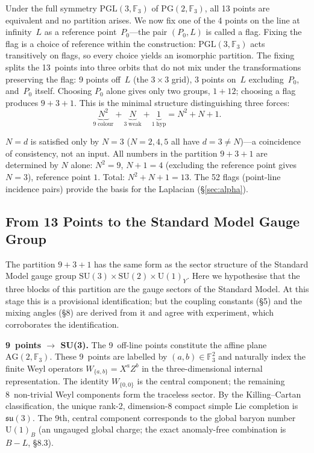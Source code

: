 \documentclass[12pt,a4paper]{article}
\begin{document}
Under the full symmetry $\mathrm{PGL}(3, \mathbb{F}_3)$ of $\mathrm{PG}(2, \mathbb{F}_3)$, all 13 points are equivalent and no partition arises. We now fix one of the 4 points on the line at infinity~$L$ as a reference point~$P_0$---the pair $(P_0, L)$ is called a flag. Fixing the flag is a choice of reference within the construction: $\mathrm{PGL}(3, \mathbb{F}_3)$ acts transitively on flags, so every choice yields an isomorphic partition. The fixing splits the 13~points into three orbits that do not mix under the transformations preserving the flag: 9 points off~$L$ (the $3\times 3$ grid),
3 points on~$L$ excluding~$P_0$, and~$P_0$ itself.
Choosing $P_0$ alone gives only two groups, $1{+}12$;
choosing a flag produces $9{+}3{+}1$.
This is the minimal structure distinguishing three forces:
\begin{equation}
  \underbrace{N^2}_{9\;\mathrm{colour}} +
  \underbrace{N}_{3\;\mathrm{weak}} +
  \underbrace{1}_{1\;\mathrm{hyp}} = N^2 + N + 1.
\end{equation}

$N = d$ is satisfied only by $N = 3$ ($N = 2, 4, 5$ all have $d = 3 \neq N$)---a coincidence of consistency, not an input.
All numbers in the partition $9{+}3{+}1$ are determined by $N$ alone:
$N^2 = 9$, $N{+}1 = 4$ (excluding the reference point gives $N = 3$), reference point $1$.
Total: $N^2{+}N{+}1 = 13$.
The 52 flags (point-line incidence pairs) provide the basis for the Laplacian (\S\ref{sec:alpha}).

\subsection{From 13 Points to the Standard Model Gauge Group}

The partition $9{+}3{+}1$ has the same form as the sector structure of the
Standard Model gauge group
$\mathrm{SU}(3){\times}\mathrm{SU}(2){\times}\mathrm{U}(1)_Y$.
Here we hypothesise that the three blocks of this partition are the
gauge sectors of the Standard Model. At this stage this is a provisional identification; but the
coupling constants (\S5) and the mixing angles (\S8) are derived from it and agree with experiment, which corroborates the identification.

\noindent\textbf{9~points $\to$ SU(3).}\;
The 9~off-line points constitute the affine plane
$\mathrm{AG}(2, \mathbb{F}_3)$.
These 9~points are labelled by $(a,b) \in \mathbb{F}_3^2$ and
naturally index the finite Weyl operators
$W_{\{a,b\}} = X^a Z^b$ in the three-dimensional internal
representation.
The identity $W_{\{0,0\}}$ is the central component; the remaining
8~non-trivial Weyl components form the traceless sector.
By the Killing--Cartan classification, the unique rank-2,
dimension-8 compact simple Lie completion is $\mathfrak{su}(3)$.
The 9th, central component corresponds to the global baryon number
$\mathrm{U}(1)_B$ (an ungauged global charge; the exact anomaly-free combination is $B{-}L$, \S8.3).
\end{document}
